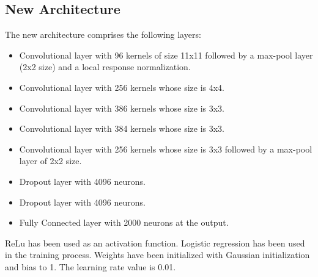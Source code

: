 \subsection{New Architecture} \label{subsec:ejecucion1}
The new architecture comprises the following layers:
\begin{itemize}[itemsep=2pt,topsep=8pt,parsep=0pt,partopsep=20pt]
\item Convolutional layer with 96 kernels of size 11x11 followed by a max-pool layer (2x2 size) and a local response normalization.
\item Convolutional layer with 256 kernels whose size is 4x4.
\item Convolutional layer with 386 kernels whose size is 3x3.
\item Convolutional layer with 384 kernels whose size is 3x3.
\item Convolutional layer with 256 kernels whose size is 3x3 followed by a max-pool layer of 2x2 size.
\item Dropout layer with 4096 neurons.
\item Dropout layer with 4096 neurons.
\item Fully Connected layer with 2000 neurons at the output.
\end{itemize}

ReLu has been used as an activation function. Logistic regression has been used in the training process. Weights have been initialized with Gaussian initialization and bias to 1. The learning rate value is 0.01.

